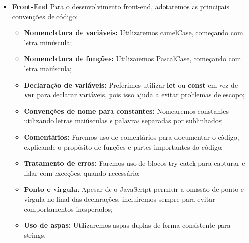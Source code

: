 \begin{itemize}
    \item \textbf{Front-End}
     Para o desenvolvimento front-end, adotaremos as principais convenções de código:
     \begin{itemize}
        \item \textbf{Nomenclatura de variáveis:}
        Utilizaremos camelCase, começando com letra minúscula;
        \item \textbf{Nomenclatura de funções:}
        Utilizaremos PascalCase, começando com letra maiúscula;
        \item \textbf{Declaração de variáveis:}
        Preferimos utilizar \textbf{let} ou \textbf{const} em vez de \textbf{var} para declarar variáveis, pois isso ajuda a evitar problemas de escopo;
        \item \textbf{Convenções de nome para constantes:}
        Nomearemos constantes utilizando letras maiúsculas e palavras separadas por sublinhados;
        \item \textbf{Comentários:}
        Faremos uso de comentários para documentar o código, explicando o propósito de funções e partes importantes do código;
        \item \textbf{Tratamento de erros:}
        Faremos uso de blocos try-catch para capturar e lidar com exceções, quando necessário;
        \item \textbf{Ponto e vírgula:}
         Apesar de o JavaScript permitir a omissão de ponto e vírgula no final das declarações, incluiremos sempre para evitar comportamentos inesperados;
        \item \textbf{Uso de aspas:}
        Utilizaremos aspas duplas de forma consistente para strings.
     \end{itemize}
\end{itemize}
